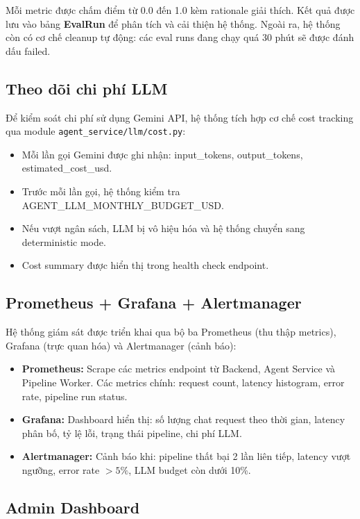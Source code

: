 Mỗi metric được chấm điểm từ 0.0 đến 1.0 kèm rationale giải thích. Kết quả được lưu vào bảng \textbf{EvalRun} để phân tích và cải thiện hệ thống. Ngoài ra, hệ thống còn có cơ chế cleanup tự động: các eval runs đang chạy quá 30 phút sẽ được đánh dấu failed.

\subsection{Theo dõi chi phí LLM}

Để kiểm soát chi phí sử dụng Gemini API, hệ thống tích hợp cơ chế cost tracking qua module \texttt{agent\_service/llm/cost.py}:

\begin{itemize}
    \item Mỗi lần gọi Gemini được ghi nhận: input\_tokens, output\_tokens, estimated\_cost\_usd.
    \item Trước mỗi lần gọi, hệ thống kiểm tra AGENT\_LLM\_MONTHLY\_BUDGET\_USD.
    \item Nếu vượt ngân sách, LLM bị vô hiệu hóa và hệ thống chuyển sang deterministic mode.
    \item Cost summary được hiển thị trong health check endpoint.
\end{itemize}

\subsection{Prometheus + Grafana + Alertmanager}

Hệ thống giám sát được triển khai qua bộ ba Prometheus (thu thập metrics), Grafana (trực quan hóa) và Alertmanager (cảnh báo):

\begin{itemize}
    \item \textbf{Prometheus:} Scrape các metrics endpoint từ Backend, Agent Service và Pipeline Worker. Các metrics chính: request count, latency histogram, error rate, pipeline run status.
    \item \textbf{Grafana:} Dashboard hiển thị: số lượng chat request theo thời gian, latency phân bố, tỷ lệ lỗi, trạng thái pipeline, chi phí LLM.
    \item \textbf{Alertmanager:} Cảnh báo khi: pipeline thất bại 2 lần liên tiếp, latency vượt ngưỡng, error rate $>5\%$, LLM budget còn dưới 10\%.
\end{itemize}

\subsection{Admin Dashboard}

